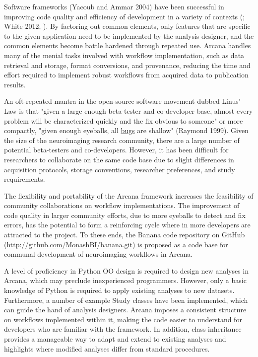 Software frameworks (Yacoub and Ammar 2004) have been successful in
improving code quality and efficiency of development in a variety of
contexts (\cite{moore_professional_2008}; White 2012; \cite{abadi_tensorflow:_2016}). By
factoring out common elements, only features that are specific to the
given application need to be implemented by the analysis designer, and
the common elements become battle hardened through repeated use. Arcana
handles many of the menial tasks involved with workflow implementation,
such as data retrieval and storage, format conversions, and provenance,
reducing the time and effort required to implement robust workflows from
acquired data to publication results.

An oft-repeated mantra in the open-source software movement dubbed
Linus' Law is that "given a large enough beta-tester and co-developer
base, almost every problem will be characterized quickly and the fix
obvious to someone" or more compactly, "given enough eyeballs, all
\href{https://en.wikipedia.org/wiki/Software_bug}{bugs} are shallow"
(Raymond 1999). Given the size of the neuroimaging research community,
there are a large number of potential beta-testers and co-developers.
However, it has been difficult for researchers to collaborate on the
same code base due to slight differences in acquisition protocols,
storage conventions, researcher preferences, and study requirements.

The flexibility and portability of the Arcana framework increases the
feasibility of community collaborations on workflow implementations. The
improvement of code quality in larger community efforts, due to more
eyeballs to detect and fix errors, has the potential to form a
reinforcing cycle where in more developers are attracted to the project.
To these ends, the Banana code repository on GitHub
(\url{http://github.com/MonashBI/banana.git}) is proposed as a code base
for communal development of neuroimaging workflows in Arcana.

A level of proficiency in Python OO design is required to design new
analyses in Arcana, which may preclude inexperienced programmers.
However, only a basic knowledge of Python is required to apply existing
analyses to new datasets. Furthermore, a number of example Study classes
have been implemented, which can guide the hand of analysis designers.
Arcana imposes a consistent structure on workflows implemented within
it, making the code easier to understand for developers who are familiar
with the framework. In addition, class inheritance provides a manageable
way to adapt and extend to existing analyses and highlights where
modified analyses differ from standard procedures.

